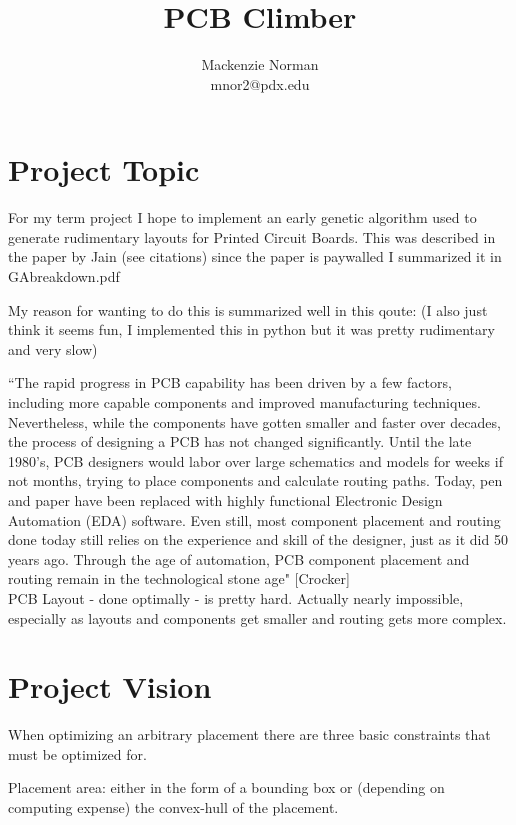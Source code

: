 \documentclass{article}
\title{PCB Climber}
\author{Mackenzie Norman\\ mnor2@pdx.edu}
\begin{document}
\maketitle
\section{Project Topic}
For my term project I hope to implement an early genetic algorithm used to generate rudimentary layouts for Printed Circuit Boards. This was described in the paper by Jain (see citations) since the paper is paywalled I summarized it in GA\textunderscore breakdown.pdf

\noindent My reason for wanting to do this is summarized well in this qoute: (I also just think it seems fun, I implemented this in python but it was pretty rudimentary and very slow)


``The rapid progress in PCB capability has been driven by a few factors, including more capable components and improved manufacturing techniques. Nevertheless, while the components have gotten smaller and faster over decades, the process of designing a PCB has not changed significantly. Until the late 1980’s, PCB designers would labor over large schematics and models for weeks if not months, trying to place components and calculate routing paths. Today, pen and paper have been replaced with highly functional Electronic Design Automation (EDA) software. Even still, most component placement and routing done today still relies on the experience and skill of the designer, just as it did 50 years ago. Through the age of automation, PCB component placement and routing remain in the technological stone age" [Crocker]\\

PCB Layout - done optimally - is pretty hard. Actually nearly impossible, especially as layouts and components get smaller and routing gets more complex.  \\



\section{Project Vision}

When optimizing an arbitrary placement there are three basic constraints that must be optimized for.

Placement area: either in the form of a bounding box or (depending on computing expense) the convex-hull of the placement. 
\end{document}
